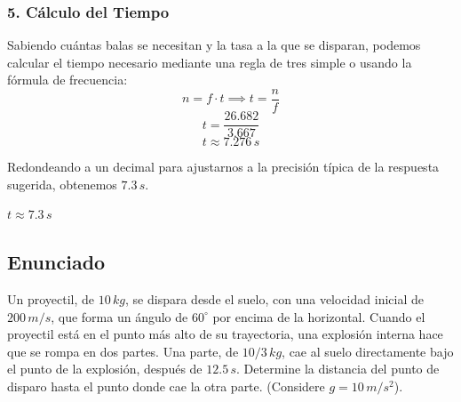 \documentclass[12pt, a4paper]{article}
\begin{document}
\subsubsection*{5. Cálculo del Tiempo}
Sabiendo cuántas balas se necesitan y la tasa a la que se disparan, podemos calcular el tiempo necesario mediante una regla de tres simple o usando la fórmula de frecuencia:
\[ n = f \cdot t \implies t = \frac{n}{f} \]
\[ t = \frac{26.682}{3.667} \]
\[ t \approx 7.276 \, \si{s} \]

Redondeando a un decimal para ajustarnos a la precisión típica de la respuesta sugerida, obtenemos $7.3 \, \si{s}$.

\begin{tcolorbox}[colback=green!5!white, colframe=green!50!black, title=Respuesta Final]
\centering \Large $t \approx 7.3 \, \si{s}$
\end{tcolorbox}

\newpage

\subsection*{Enunciado}
Un proyectil, de $10 \, \si{kg}$, se dispara desde el suelo, con una velocidad inicial de $200 \, \si{m/s}$, que forma un ángulo de $60^\circ$ por encima de la horizontal. Cuando el proyectil está en el punto más alto de su trayectoria, una explosión interna hace que se rompa en dos partes. Una parte, de $10/3 \, \si{kg}$, cae al suelo directamente bajo el punto de la explosión, después de $12.5 \, \si{s}$. Determine la distancia del punto de disparo hasta el punto donde cae la otra parte. (Considere $g = 10 \, \si{m/s^2}$).

\begin{center}
\end{center}
\end{document}
